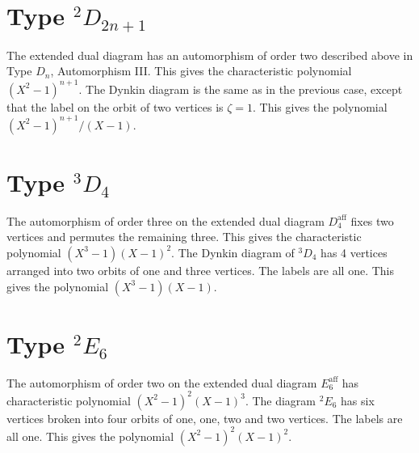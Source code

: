 \documentclass[11pt]{amsart}
\theoremstyle{plain}
\theoremstyle{definition}
\def\aff{\operatorname{aff}}
\begin{document}
\section{Type ${}^2D_{2n+1}$}
The extended dual diagram has an automorphism of order two described
above in Type $D_n$, Automorphism III.  This gives the characteristic
polynomial $(X^2-1)^{n+1}$.  The Dynkin diagram is the same as in the
previous case, except that the label on the orbit of two vertices is
$\zeta=1$.  This gives the polynomial
$(X^2-1)^{n+1}/(X-1)$.

\section{Type ${}^3D_4$}
The automorphism of order three on the extended dual 
diagram $D_4^{\aff}$ fixes
two vertices and permutes the remaining three.  This gives
the characteristic polynomial $(X^3-1)(X-1)^2$.  The Dynkin diagram
of ${}^3D_4$ has 4 vertices arranged into two orbits of one and three
vertices.  The labels are all one.  This gives the polynomial
$(X^3-1)(X-1)$.

\section{Type ${}^2E_6$}
The automorphism of order two on the extended dual diagram $E_6^{\aff}$
has characteristic polynomial $(X^2-1)^2(X-1)^3$.  The diagram
${}^2E_6$ has six vertices broken into four orbits of one, one, two and
two vertices.  The labels are all one.  This gives the polynomial
$(X^2-1)^2(X-1)^2$.

\bigskip
\end{document}

